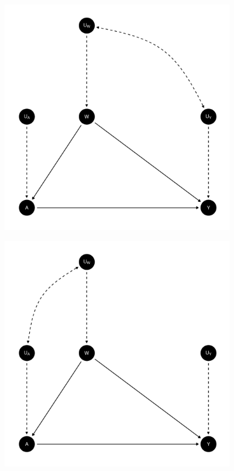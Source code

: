 \documentclass{article}\usepackage[]{graphicx}\usepackage[]{xcolor}
\newenvironment{knitrout}{}{} %
\begin{document}
\begin{enumerate}[label=\textbf{\arabic*.}]
\begin{enumerate}[label=\textbf{(\alph*)}]
\begin{itemize}
\begin{itemize}
  \end{itemize}
    
\begin{knitrout}
\color{fgcolor}
\includegraphics[width=4in]{figure/unnamed-chunk-3-1} 

\end{knitrout}



    
\begin{knitrout}
\color{fgcolor}
\includegraphics[width=4in]{figure/unnamed-chunk-4-1} 

\end{knitrout}


\end{itemize}
\end{enumerate}
\end{enumerate}
\end{document}
